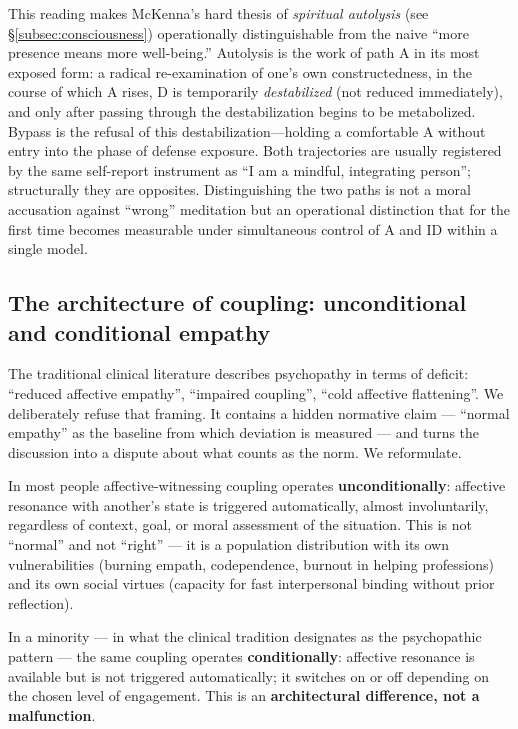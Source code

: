 This reading makes McKenna's hard thesis of \emph{spiritual autolysis} (see §\ref{subsec:consciousness}) operationally distinguishable from the naive ``more presence means more well-being.'' Autolysis is the work of path A in its most exposed form: a radical re-examination of one's own constructedness, in the course of which A rises, D is temporarily \emph{destabilized} (not reduced immediately), and only after passing through the destabilization begins to be metabolized. Bypass is the refusal of this destabilization---holding a comfortable A without entry into the phase of defense exposure. Both trajectories are usually registered by the same self-report instrument as ``I am a mindful, integrating person''; structurally they are opposites. Distinguishing the two paths is not a moral accusation against ``wrong'' meditation but an operational distinction that for the first time becomes measurable under simultaneous control of A and ID within a single model.

\subsection{The architecture of coupling: unconditional and conditional empathy}
\label{subsec:architecture}

The traditional clinical literature describes psychopathy in terms of deficit: ``reduced affective empathy'', ``impaired coupling'', ``cold affective flattening''. We deliberately refuse that framing. It contains a hidden normative claim --- ``normal empathy'' as the baseline from which deviation is measured --- and turns the discussion into a dispute about what counts as the norm. We reformulate.

In most people affective-witnessing coupling operates \textbf{unconditionally}: affective resonance with another's state is triggered automatically, almost involuntarily, regardless of context, goal, or moral assessment of the situation. This is not ``normal'' and not ``right'' --- it is a population distribution with its own vulnerabilities (burning empath, codependence, burnout in helping professions) and its own social virtues (capacity for fast interpersonal binding without prior reflection).

In a minority --- in what the clinical tradition designates as the psychopathic pattern --- the same coupling operates \textbf{conditionally}: affective resonance is available but is not triggered automatically; it switches on or off depending on the chosen level of engagement. This is an \textbf{architectural difference, not a malfunction}.

